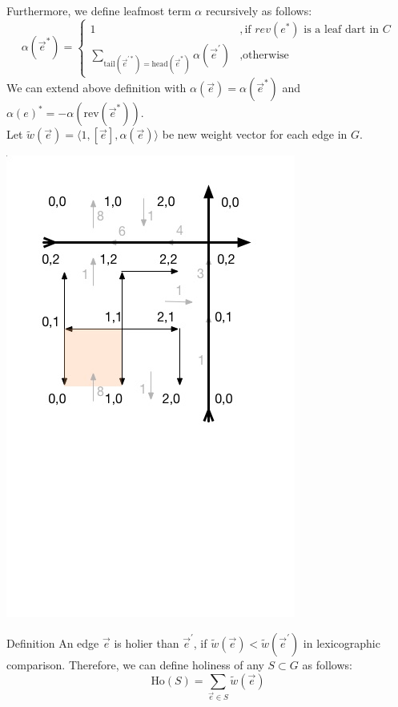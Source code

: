 \documentclass{article}
\begin{document}
Furthermore, we define leafmost term $\alpha$ recursively as follows: \\
\[ \alpha(\vec{e}^*) = \begin{cases} 1 & ,\mbox{if } rev(e^*) \mbox{ is a leaf dart in } C \\
                           \sum \limits_{ \text{tail}(\vec{e}^{'*})
                           = \text{head}(\vec{e}^*) } \alpha(\vec{e}^{'}) & ,
                           \mbox{otherwise} \end{cases}\]
We can extend above definition with $\alpha(\vec{e}) = \alpha( \vec{e}^* )$ and 
  $\alpha(e)^* = - \alpha(\text{rev}(\vec{e}^*))$. \\

Let $\tilde w(\vec{e}) = \langle 1, [\vec{e}], \alpha(\vec{e}) \rangle$ be new
weight vector for each edge in $G$.
\begin{center}
\includegraphics[scale = 0.5]{g1.jpg}
\end{center}

\vspace{-4.0cm} %

\begin{oneshot}{Definition}
An edge $\vec{e}$ is holier than $\vec{e}^{'}$, 
if $\tilde w(\vec{e}) < \tilde w(\vec{e}^{'})$ in lexicographic comparison. 
Therefore, we can define holiness of any $S \subset G $ as follows:
\[\text{Ho}(S) = \sum \limits_{\vec{e} \in S} \tilde w(\vec{e})\]
\end{oneshot}
\end{document}
